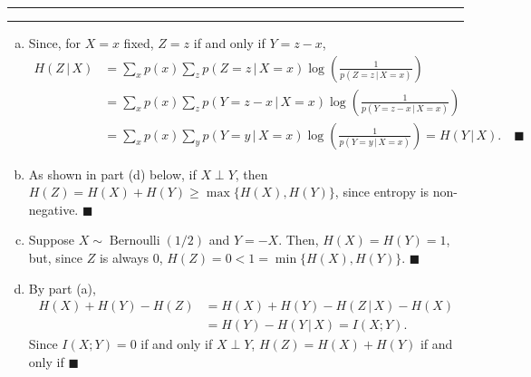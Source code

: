 \documentclass[11pt]{article}
\newcounter{questionCounter}
\newcounter{partCounter}[questionCounter]
\newenvironment{question}[2][\arabic{questionCounter}]{%
    \setcounter{partCounter}{0}%
    \vspace{.25in} \hrule \vspace{0.5em}%
        \noindent{\bf #2}%
    \vspace{0.8em} \hrule \vspace{.10in}%
    \addtocounter{questionCounter}{1}%
}{}
\renewcommand{\qed}{\quad $\blacksquare$}
\newcommand{\mqed}{\quad \blacksquare}
\newcommand{\pr}[1]{\mathsf{P}\left( #1 \right)} %
\newcommand{\Bern}[1]{\operatorname{Bernoulli}\left( #1 \right)} %
\newcommand{\giv}{\, | \,} %
\begin{document}
\newpage
\begin{question}{Problem 3}
\begin{enumerate}[(a)]
\item Since, for $X = x$ fixed, $Z = z$ if and only if $Y = z - x$,
\begin{align*}
H(Z \, | \, X)
 & = \sum_x p(x) \sum_z p(Z = z \, | \, X = x)
                     \log\left( \frac{1}{p(Z = z \, | \, X = x)} \right) \\
 & = \sum_x p(x) \sum_z p(Y = z - x \, | \, X = x)
                     \log\left( \frac{1}{p(Y = z - x \, | \, X = x)} \right) \\
 & = \sum_x p(x) \sum_y p(Y = y \, | \, X = x)
                     \log\left( \frac{1}{p(Y = y \, | \, X = x)} \right)
 = H(Y \, | \, X). \mqed
\end{align*}

\item As shown in part (d) below, if $X \perp Y$, then $H(Z) = H(X) + H(Y) \geq
\max\{H(X),H(Y)\}$, since entropy is non-negative. \qed

\item Suppose $X \sim \Bern{1/2}$ and $Y = -X$. Then, $H(X) = H(Y) = 1$, but,
since $Z$ is always $0$, $H(Z) = 0 < 1 = \min\{H(X),H(Y)\}$. \qed

\item By part (a),
\begin{align*}
H(X) + H(Y) - H(Z)
 & = H(X) + H(Y) - H(Z \giv X) - H(X) \\
 & = H(Y) - H(Y \giv X)
   = I(X;Y).
\end{align*}
Since $I(X;Y) = 0$ if and only if $X \perp Y$, $H(Z) = H(X) + H(Y)$ if and only
if  \qed

\end{enumerate}
\end{question}
\end{document}
